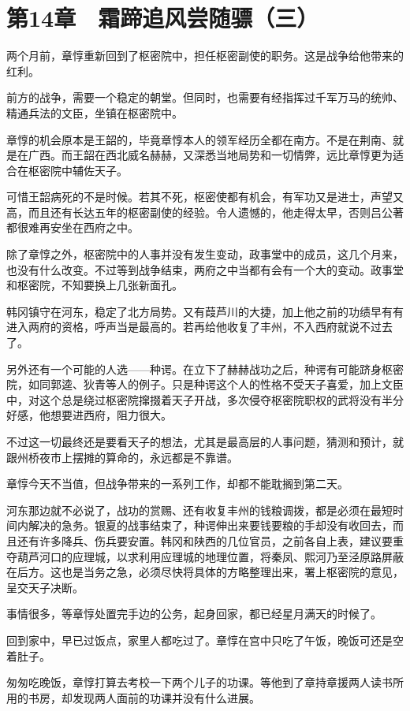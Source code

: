 \section{第14章　霜蹄追风尝随骠（三）}

两个月前，章惇重新回到了枢密院中，担任枢密副使的职务。这是战争给他带来的红利。

前方的战争，需要一个稳定的朝堂。但同时，也需要有经指挥过千军万马的统帅、精通兵法的文臣，坐镇在枢密院中。

章惇的机会原本是王韶的，毕竟章惇本人的领军经历全都在南方。不是在荆南、就是在广西。而王韶在西北威名赫赫，又深悉当地局势和一切情弊，远比章惇更为适合在枢密院中辅佐天子。

可惜王韶病死的不是时候。若其不死，枢密使都有机会，有军功又是进士，声望又高，而且还有长达五年的枢密副使的经验。令人遗憾的，他走得太早，否则吕公著都很难再安坐在西府之中。

除了章惇之外，枢密院中的人事并没有发生变动，政事堂中的成员，这几个月来，也没有什么改变。不过等到战争结束，两府之中当都有会有一个大的变动。政事堂和枢密院，不知要换上几张新面孔。

韩冈镇守在河东，稳定了北方局势。又有葭芦川的大捷，加上他之前的功绩早有有进入两府的资格，呼声当是最高的。若再给他收复了丰州，不入西府就说不过去了。

另外还有一个可能的人选——种谔。在立下了赫赫战功之后，种谔有可能跻身枢密院，如同郭逵、狄青等人的例子。只是种谔这个人的性格不受天子喜爱，加上文臣中，对这个总是绕过枢密院撺掇着天子开战，多次侵夺枢密院职权的武将没有半分好感，他想要进西府，阻力很大。

不过这一切最终还是要看天子的想法，尤其是最高层的人事问题，猜测和预计，就跟州桥夜市上摆摊的算命的，永远都是不靠谱。

章惇今天不当值，但战争带来的一系列工作，却都不能耽搁到第二天。

河东那边就不必说了，战功的赏赐、还有收复丰州的钱粮调拨，都是必须在最短时间内解决的急务。银夏的战事结束了，种谔伸出来要钱要粮的手却没有收回去，而且还有许多降兵、伤兵要安置。韩冈和陕西的几位官员，之前各自上表，建议要重夺葫芦河口的应理城，以求利用应理城的地理位置，将秦凤、熙河乃至泾原路屏蔽在后方。这也是当务之急，必须尽快将具体的方略整理出来，署上枢密院的意见，呈交天子决断。

事情很多，等章惇处置完手边的公务，起身回家，都已经星月满天的时候了。

回到家中，早已过饭点，家里人都吃过了。章惇在宫中只吃了午饭，晚饭可还是空着肚子。

匆匆吃晚饭，章惇打算去考校一下两个儿子的功课。等他到了章持章援两人读书所用的书房，却发现两人面前的功课并没有什么进展。

